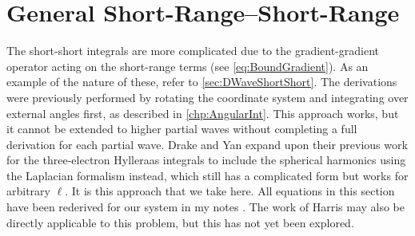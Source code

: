 \documentclass[Dissertation.tex]{subfiles}
\begin{document}


\section{General Short-Range--Short-Range}
\label{sec:GeneralShort}

The short-short integrals are more complicated due to the 
gradient-gradient operator acting on the short-range terms (see \cref{eq:BoundGradient}).
As an example of the nature of these, refer to \cref{sec:DWaveShortShort}.
The derivations were previously performed by rotating 
the coordinate system and integrating over external angles first, as 
described in \cref{chp:AngularInt}. This approach works, but it 
cannot be extended to higher partial waves without completing a full 
derivation for each partial wave. %
Drake and Yan \cite{Yan1997} expand upon 
their previous work for the three-electron Hylleraas integrals to include the 
spherical harmonics using the Laplacian formalism instead, which still
has a complicated form but works for arbitrary $\ell$.
It is this approach that we take here. All equations in this
section have been rederived for our system in my notes \cite{Wiki,figshare}.
The work of Harris \cite{Harris2005a} may also be directly
applicable to this problem, but this has not yet been explored.
\end{document}
